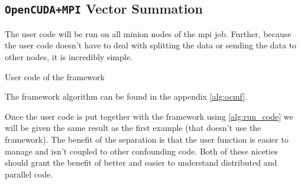 \subsection{\texttt{OpenCUDA+MPI} Vector Summation}

The user code will be run on all minion nodes of the \gls{mpi} job. Further,
because the user code doesn't have to deal with splitting the data or sending
the data to other nodes, it is incredibly simple.

\begin{algorithm}
\begin{algorithmic}
\EndFunction{}
\end{algorithmic}
\caption{User code of the framework}
\label{alg:ocmf_user_code}
\end{algorithm}

The framework algorithm can be found in the appendix \cref{alg:ocmf}.

Once the user code is put together with the framework using \cref{alg:run_code}
we will be given the same result as the first example (that doesn't use the
framework). The benefit of the separation is that the user function is easier
to manage and isn't coupled to other confounding code. Both of these niceties
should grant the benefit of better and easier to understand distributed and
parallel code.
